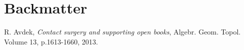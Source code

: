 \documentclass[11pt]{amsart}
\begin{document}
\section{Backmatter}

\begin{thebibliography}{}
\begin{comment}

\bibitem[Abb11]{Abbas:JBook}
C. Abbas, \textit{Holomorphic open book decompositions}, Duke Math. J., Vol. 158, p.29-82, 2011.

\bibitem[AbbCH05]{ACH:PlanarWeinstein}
C. Abbas, K. Cieliebak, H. Hofer, \textit{The Weinstein conjecture for planar contact structures in dimension three}, Comment. Math. Helv. 80, p.771–793, 2005.

\bibitem[AS06]{AS:Cotangent}
A. Abbondandolo and M. Schwarz, \textit{On the Floer homology of cotangent bundles}, Comm.
Pure Appl. Math., 59, p.254–316, 2006.

\bibitem[Abo15]{Abouzaid:Viterbo}
M. Abouzaid, \textit{Symplectic cohomology and Viterbo’s theorem}, In ``Free loop
spaces in geometry and topology'', volume 24 of IRMA Lect. Math. Theor. Phys., Eur. Math. Soc., Z\"{u}rich, p.271–485, 2015

\bibitem[Al79]{Ahlfors}
L. Ahlfors, \textit{Complex Analysis: An Introduction to the Theory of Analytic Functions of One Complex Variable}, New York: McGraw-Hill, 1979.


\bibitem[AS08]{AS:Pencil}
D. Auroux and I. Smith, \textit{Lefschetz pencils, branched covers and symplectic invariants}, in \textit{Symplectic 4-manifolds and algebraic surfaces}, Lecture Notes in Math vol. 1938, Springer, Berlin, p.1–53, 2008.
\end{comment}

R. Avdek, \textit{Contact surgery and supporting open books}, Algebr. Geom. Topol. Volume 13, p.1613-1660, 2013.

\begin{comment}
\bibitem[Av20]{Avdek:Dynamics}
R. Avdek, \textit{Combinatorial Reeb dynamics on punctured contact $3$-manifolds}, to appear in Geom. Topol., arXiv:2005.11428, 2020.

\bibitem[Av21a]{Avdek:Liouville}
R. Avdek, \textit{Liouville hypersurfaces and connect sum cobordisms}, J. Symplectic Geom., Vol. 19, 2021.

\bibitem[Av21b]{Avdek:LSFT}
R. Avdek, \textit{Simplified SFT moduli spaces for Legendrian links}, arXiv:2104.00505, 2021.


\end{comment}
\end{thebibliography}
\end{document}
